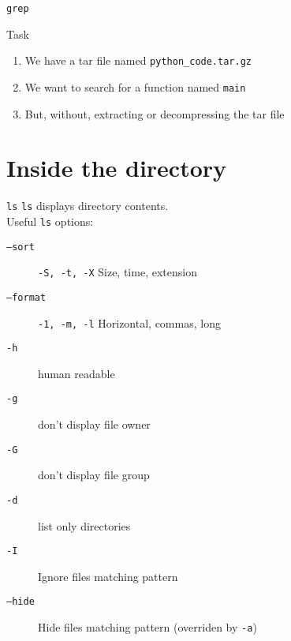 \documentclass[11pt]{beamer}
\begin{document}
			\begin{frame}[t]{\texttt{grep}}
				\begin{block}{Task}
					\begin{enumerate}
						\item We have a tar file named \texttt{python\_code.tar.gz}
						\item We want to search for a function named \texttt{main}
						\item But, without, extracting or decompressing the tar file
					\end{enumerate}
				\end{block}	
				\begin{example}
					\begin{semiverbatim}
					\end{semiverbatim}
				\end{example}
			\end{frame}

	\section[Directory]{Inside the directory}
			\begin{frame}{ \texttt{ls}}
				\texttt{ls} displays directory contents. \\
				Useful \texttt{ls} options:
				\begin{description}
					\item[ \texttt{--sort}] \texttt{-S, -t, -X} Size, time, extension
					\item[ \texttt{--format}] \texttt{-1, -m, -l} Horizontal, commas, long
					\item[ \texttt{-h}] human readable
					\item[ \texttt{-g}] don't display file owner
					\item[ \texttt{-G}] don't display file group
					\item[ \texttt{-d}] list only directories
					\item[ \texttt{-I}] Ignore files matching pattern
					\item[ \texttt{--hide}]  Hide files matching pattern (overriden by \texttt{-a})
				\end{description}
			\end{frame}
\end{document}
